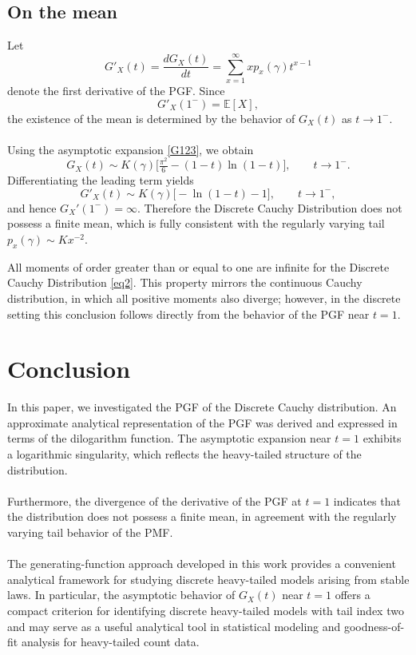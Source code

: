 \documentclass[twoside]{article}
\begin{document}
\subsection{On the mean} 
Let 
$$
G'_X(t)=\frac{dG_X(t)}{dt}=\sum_{x=1}^{\infty} x p_x(\gamma) t^{x-1}
$$ 
denote the first derivative of the PGF.  Since 
\[ 
G'_X(1^-)=\mathbb{E}[X], 
\] 
the existence of the mean is determined by the behavior of $G_X​(t)$ as $t \rightarrow 1^{-}$.\\
\\
Using the asymptotic expansion \eqref{G123}, we obtain
$$
G_X(t) \sim K(\gamma)\Big[\tfrac{\pi^2}{6}-(1-t)\ln(1-t)\Big], \qquad t\to 1^-.
$$
Differentiating the leading term yields
$$
G'_X(t)\sim K(\gamma)\bigl[-\ln(1-t)-1\bigr], \qquad t\to 1^-, 
$$
and hence $G_X'(1^-)=\infty.$
Therefore the Discrete Cauchy Distribution does not possess a finite mean, which is fully consistent with the regularly varying tail
$p_x(\gamma)\sim K x^{-2}.$

 

\begin{cor}
All moments of order greater than or equal to one are infinite for the Discrete Cauchy Distribution \eqref{eq2}. This property mirrors the continuous Cauchy distribution, in which all positive moments also diverge; however, in the discrete setting this conclusion follows directly from the behavior of the PGF near $t=1$.
\end{cor}

\section{Conclusion}
In this paper, we investigated the  PGF  of the Discrete Cauchy distribution. An approximate analytical representation of the PGF was derived and expressed in terms of the dilogarithm function. The asymptotic expansion near $t=1$ exhibits a logarithmic singularity, which reflects the heavy-tailed structure of the distribution.\\
\\
Furthermore, the divergence of the derivative of the PGF at $t=1$ indicates that the distribution does not possess a finite mean, in agreement with the regularly varying tail behavior of the PMF.\\
\\
The generating-function approach developed in this work provides a convenient analytical framework for studying discrete heavy-tailed models arising from stable laws. In particular, the asymptotic behavior of $G_X(t)$ near $t=1$ offers a compact criterion for identifying discrete heavy-tailed models with tail index two and may serve as a useful analytical tool in statistical modeling and goodness-of-fit analysis for heavy-tailed count data.
  
\end{document}

